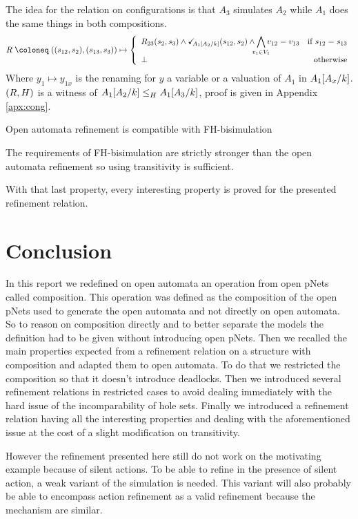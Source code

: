 \documentclass{article}
\begin{document}
\begin{proofsketch}
The idea for the relation on configurations is that \(A_3\) simulates \(A_2\) while \(A_1\) does the same things in both compositions.
\[ R \defobject \mpar{\mpar{s_{12}, s_2}, \mpar{s_{13}, s_3}} \mapsto \choice{R_{23}\mpar{s_2, s_3} \wedge \reach{A_1\subst{A_2}{k}}\mpar{s_{12}, s_2} \wedge \bigwedge_\subbox{v_1 \in V_1} v_{12} = v_{13} & \text{if } s_{12} = s_{13} \\ \bot & \text{otherwise}} \]
Where \(y_1 \mapsto y_{1x}\) is the renaming for \(y\) a variable or a valuation of \(A_1\) in \(A_1\subst{A_x}{k}\).
\(\mpar{R, H}\) is a witness of \(\wrel{A_1\subst{A_2}{k}}{A_1\subst{A_3}{k}}{H}\), proof is given in Appendix \ref{apx:cong}.
\end{proofsketch}
\begin{thm} Open automata refinement is compatible with FH-bisimulation \end{thm}
\begin{proofsketch} The requirements of FH-bisimulation are strictly stronger than the open automata refinement so using transitivity is sufficient. \end{proofsketch}
With that last property, every interesting property is proved for the presented refinement relation.


\section{Conclusion}\label{sec:ccl}
In this report we redefined on open automata an operation from open pNets called composition.
This operation was defined as the composition of the open pNets used to generate the open automata and not directly on open automata.
So to reason on composition directly and to better separate the models the definition had to be given without introducing open pNets.
Then we recalled the main properties expected from a refinement relation on a structure with composition and adapted them to open automata.
To do that we restricted the composition so that it doesn't introduce deadlocks.
Then we introduced several refinement relations in restricted cases to avoid dealing immediately with the hard issue of the incomparability of hole sets.
Finally we introduced a refinement relation having all the interesting properties and dealing with the aforementioned issue at the cost of a slight modification on transitivity.

However the refinement presented here still do not work on the motivating example because of silent actions.
To be able to refine in the presence of silent action, a weak variant of the simulation is needed.
This variant will also probably be able to encompass action refinement as a valid refinement because the mechanism are similar.
\end{document}
